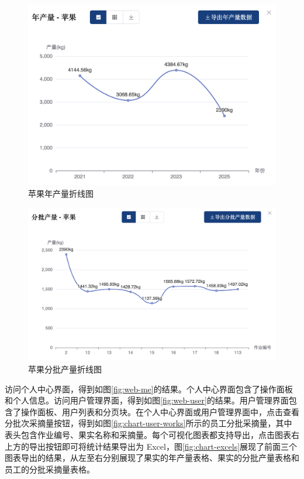\begin{figure}
    \centering
    \includegraphics[width=\linewidth]{../result/chart-apple-year.png}
    \caption{苹果年产量折线图}
    \label{fig:chart-apple-year}
\end{figure}

\begin{figure}
    \centering
    \includegraphics[width=\linewidth]{../result/chart-apple-works.png}
    \caption{苹果分批产量折线图}
    \label{fig:chart-apple-works}
\end{figure}

访问个人中心界面，得到如图\ref{fig:web-me}的结果。个人中心界面包含了操作面板和个人信息。访问用户管理界面，得到如图\ref{fig:web-user}的结果。用户管理界面包含了操作面板、用户列表和分页块。在个人中心界面或用户管理界面中，点击查看分批次采摘量按钮，得到如图\ref{fig:chart-user-works}所示的员工分批采摘量，其中表头包含作业编号、果实名称和采摘量。每个可视化图表都支持导出，点击图表右上方的导出按钮即可将统计结果导出为 Excel，图\ref{fig:chart-excels}展现了前面三个图表导出的结果，从左至右分别展现了果实的年产量表格、果实的分批产量表格和员工的分批采摘量表格。

